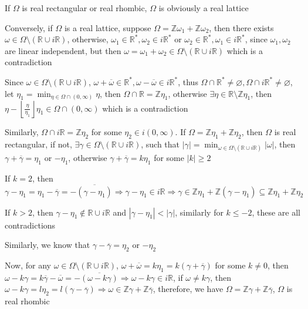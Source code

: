 \documentclass[main]{subfiles}
\begin{document}
\begin{solution}
If $\Omega$ is real rectangular or real rhombic, $\Omega$ is obviously a real lattice \par
Conversely, if $\Omega$ is a real lattice, suppose $\Omega=\mathbb{Z}\omega_1+\mathbb{Z}\omega_2$, then there exists $\omega\in\Omega\setminus(\mathbb{R}\cup i\mathbb{R})$, otherwise, $\omega_1\in\mathbb{R}^*,\omega_2\in i\mathbb{R}^*$ or $\omega_2\in\mathbb{R}^*,\omega_1\in i\mathbb{R}^*$, since $\omega_1,\omega_2$ are linear independent, but then $\omega=\omega_1+\omega_2\in\Omega\setminus(\mathbb{R}\cup i\mathbb{R})$ which is a contradiction \par
Since $\omega\in\Omega\setminus(\mathbb{R}\cup i\mathbb{R})$, $\omega+\overline{\omega}\in\mathbb{R}^*,\omega-\overline{\omega}\in i\mathbb{R}^*$, thus $\Omega\cap\mathbb{R}^*\neq\varnothing,\Omega\cap i\mathbb{R}^*\neq\varnothing$, let $\displaystyle\eta_1=\min_{\eta\in\Omega\cap(0,\infty)}\eta$, then $\Omega\cap\mathbb{R}=\mathbb{Z}\eta_1$, otherwise $\exists \eta\in \mathbb{R}\setminus\mathbb{Z}\eta_1$, then $\eta-\left\lfloor\frac{\eta}{\eta_1}\right\rfloor\eta_1\in\Omega\cap(0,\infty)$ which is a contradiction \par
Similarly, $\Omega\cap i\mathbb{R}=\mathbb{Z}\eta_2$ for some $\eta_2\in i(0,\infty)$. If $\Omega=\mathbb{Z}\eta_1+\mathbb{Z}\eta_2$, then $\Omega$ is real rectangular, if not, $\exists \gamma\in\Omega\setminus(\mathbb{R}\cup i\mathbb{R})$, such that $\displaystyle|\gamma|=\min_{\omega\in\Omega\setminus(\mathbb{R}\cup i\mathbb{R})}|\omega|$, then $\gamma+\overline{\gamma}=\eta_1$ or $-\eta_1$, otherwise $\gamma+\overline{\gamma}=k\eta_1$ for some $|k|\geq 2$ \par
If $k=2$, then $\gamma-\eta_1=\eta_1-\overline{\gamma}=-\overline{(\gamma-\eta_1)}\Rightarrow \gamma-\eta_1\in i\mathbb{R}\Rightarrow \gamma\in\mathbb{Z}\eta_1+\mathbb{Z}(\gamma-\eta_1)\subseteq\mathbb{Z}\eta_1+\mathbb{Z}\eta_2$ \par
If $k>2$, then $\gamma-\eta_1\notin \mathbb{R}\cup i\mathbb{R}$ and $|\gamma-\eta_1|<|\gamma|$, similarly for $k\leq -2$, these are all contradictions \par
Similarly, we know that $\gamma-\overline{\gamma}=\eta_2$ or $-\eta_2$ \par
Now, for any $\omega\in\Omega\setminus(\mathbb{R}\cup i\mathbb{R})$, $\omega+\overline{\omega}=k\eta_1=k(\gamma+\overline{\gamma})$ for some $k\neq 0$, then $\omega-k\gamma=k\overline{\gamma}-\overline{\omega}=-\overline{(\omega-k\gamma)}\Rightarrow \omega-k\gamma\in i\mathbb{R}$, if $\omega\neq k\gamma$, then $\omega-k\gamma=l\eta_2=l(\gamma-\overline{\gamma})\Rightarrow \omega\in \mathbb{Z}\gamma+\mathbb{Z}\overline{\gamma}$, therefore, we have $\Omega=\mathbb{Z}\gamma+\mathbb{Z}\overline{\gamma}$, $\Omega$ is real rhombic
\end{solution}
\end{document}
